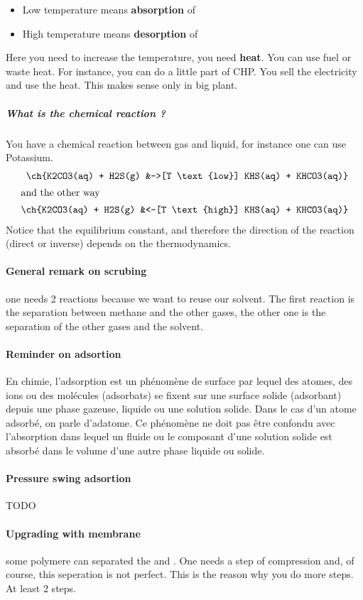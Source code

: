 \documentclass[10pt,a4paper]{article}
\begin{document}
\begin{itemize}
\item Low temperature means \textbf{absorption} of 
\item High temperature means \textbf{desorption} of 
\end{itemize}

Here you need to increase the temperature, you need \textbf{heat}. You can use fuel or waste heat. For instance, you can do a little part of CHP. You sell the electricity and use the heat. This makes sense only in big plant.

\subparagraph{What is the chemical reaction ?} You have a chemical reaction between gas and liquid, for instance one can use Potassium. 
\begin{align*}
\ch{K2CO3(aq) + H2S(g) &->[T \text{low}] KHS(aq) + KHCO3(aq)} \\
\intertext{and the other way}
\ch{K2CO3(aq) + H2S(g) &<-[T \text{high}] KHS(aq) + KHCO3(aq)}
\end{align*}
Notice that the equilibrium constant, and therefore the direction of the reaction (direct or inverse) depends on the thermodynamics.

\paragraph{General remark on scrubing} one needs 2 reactions because we want to reuse our solvent. The first reaction is the separation between methane and the other gases, the other one is the separation of the other gases and the solvent. 
\paragraph{Reminder on \textbf{ad}sortion} En chimie, l’adsorption est un phénomène de surface par lequel des atomes, des ions ou des molécules (adsorbats) se fixent sur une surface solide (adsorbant) depuis une phase gazeuse, liquide ou une solution solide. Dans le cas d'un atome adsorbé, on parle d'adatome. Ce phénomène ne doit pas être confondu avec l'absorption dans lequel un fluide ou le composant d'une solution solide est absorbé dans le volume d'une autre phase liquide ou solide.\cite{wiki_adsortion}
\paragraph{Pressure swing adsortion}
TODO
\paragraph{Upgrading with membrane}some polymere can separated the  and . One needs a step of compression and, of course, this seperation is not perfect. This is the reason why you do more steps. At least 2 steps.
\end{document}
